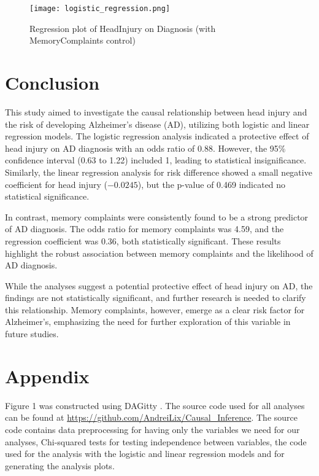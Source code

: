 \documentclass[12pt]{article}
\begin{document}
\begin{figure}[H]
    \centering
    \texttt{[image: logistic\_regression.png]}
    \caption{Regression plot of HeadInjury on Diagnosis (with MemoryComplaints control)}
    \label{fig:regression_plot}
\end{figure}


\section{Conclusion}

This study aimed to investigate the causal relationship between head injury and the risk of developing Alzheimer's disease (AD), utilizing both logistic and linear regression models. The logistic regression analysis indicated a protective effect of head injury on AD diagnosis with an odds ratio of 0.88. However, the 95\% confidence interval (0.63 to 1.22) included 1, leading to statistical insignificance. Similarly, the linear regression analysis for risk difference showed a small negative coefficient for head injury (\(-0.0245\)), but the p-value of 0.469 indicated no statistical significance.

In contrast, memory complaints were consistently found to be a strong predictor of AD diagnosis. The odds ratio for memory complaints was 4.59, and the regression coefficient was 0.36, both statistically significant. These results highlight the robust association between memory complaints and the likelihood of AD diagnosis.

While the analyses suggest a potential protective effect of head injury on AD, the findings are not statistically significant, and further research is needed to clarify this relationship. Memory complaints, however, emerge as a clear risk factor for Alzheimer's, emphasizing the need for further exploration of this variable in future studies.






\newpage
\label{sec:references}



\newpage
\appendix
\section{Appendix}
\label{sec:appendix}
 Figure 1 was constructed using DAGitty \cite{daggity}. The source code used for all analyses can be found at \url{https://github.com/AndreiLix/Causal_Inference}. The source code contains data preprocessing for having only the variables we need for our analyses, Chi-squared tests for testing independence between variables, the code used for the analysis with the logistic and linear regression models and for generating the analysis plots.
\end{document}
